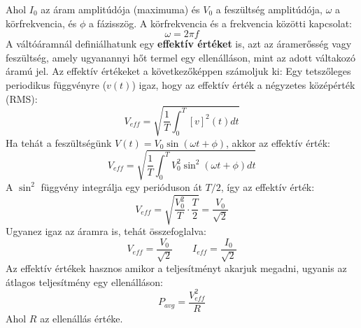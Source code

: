 \documentclass[a4paper,12pt]{article}
\begin{document}
Ahol $I_0$ az áram amplitúdója (maximuma) és $V_0$ a feszültség amplitúdója, $\omega$ a körfrekvencia, és $\phi$ a fázisszög. A körfrekvencia és a frekvencia közötti kapcsolat:
\begin{equation}
    \omega = 2 \pi f
\end{equation}
A váltóáramnál definiálhatunk egy \textbf{effektív értéket} is, azt az áramerősség vagy feszültség, amely ugyanannyi hőt termel egy ellenálláson, mint az adott váltakozó áramú jel. Az effektív értékeket a következőképpen számoljuk ki:
Egy tetszőleges periodikus függvényre ($v(t)$) igaz, hogy az effektív érték a négyzetes középérték (RMS):
\begin{equation}
    V_{eff} = \sqrt{\frac{1}{T} \int_0^T \left[v\right]^2(t) dt}
\end{equation}
Ha tehát a feszültségünk $V(t) = V_0 \sin(\omega t + \phi)$, akkor az effektív érték:
\begin{equation}
    V_{eff} = \sqrt{\frac{1}{T} \int_0^T V_0^2 \sin^2(\omega t + \phi) dt}
\end{equation}
A $\sin^2$ függvény integrálja egy perióduson át $T/2$, így az effektív érték:
\begin{equation}
    V_{eff} = \sqrt{\frac{V_0^2}{T} \cdot \frac{T}{2}} = \frac{V_0}{\sqrt{2}}
\end{equation}
Ugyanez igaz az áramra is, tehát összefoglalva:
\begin{equation}
    \boxed{V_{eff} = \frac{V_0}{\sqrt{2}} \qquad I_{eff} = \frac{I_0}{\sqrt{2}}}
\end{equation}
Az effektív értékek hasznos amikor a teljesítményt akarjuk megadni, ugyanis az átlagos teljesítmény egy ellenálláson:
\begin{equation}
    P_{avg} = \frac{V_{eff}^2}{R}
\end{equation}
Ahol $R$ az ellenállás értéke.
\end{document}
